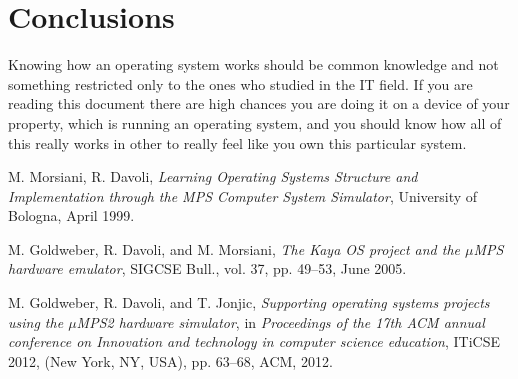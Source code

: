 \documentclass[12pt,a4paper,openright,twoside]{report}
\begin{document}
\chapter{Conclusions}
\lhead[\fancyplain{}{\bfseries\thepage}]{\fancyplain{}{\bfseries\rightmark}}
	Knowing how an operating system works should be common knowledge and not something restricted  only to the ones who studied in the IT field.
	If you are reading this document there are high chances you are doing it on a device of your property, which is running an operating system, and you should know how all of this really works in other to really feel like you own this particular system.
\begin{thebibliography}{99}

	M. Morsiani, R. Davoli,
	\textit{Learning Operating Systems Structure and Implementation through the MPS Computer System Simulator},
	University of Bologna, April 1999.

	M. Goldweber, R. Davoli, and M. Morsiani,
	\textit{The Kaya OS project and the $\mu$MPS hardware emulator},
	SIGCSE Bull., vol. 37, pp. 49–53, June 2005.
	
	M. Goldweber, R. Davoli, and T. Jonjic,
	\textit{Supporting operating systems projects using the $\mu$MPS2 hardware simulator},
	in \textit{Proceedings of the 17th ACM annual conference on Innovation and technology in computer science education},
	ITiCSE 2012, (New York, NY, USA), pp. 63–68, ACM, 2012.

\end{thebibliography}
\end{document}
